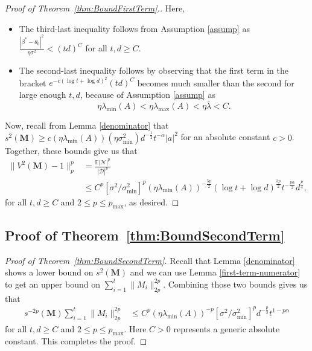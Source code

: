 \documentclass[11pt, reqno,english]{amsart}
\begin{document}
\begin{proof}[Proof of Theorem~\ref{thm:BoundFirstTerm}.]
Here,
\begin{itemize}
    \item The third-last inequality follows from Assumption \ref{assump} as $\frac{|\beta^* - \theta_0|^2}{\eta \sigma^2} < (td)^{C}$ for all $t, d \geq C$. 
    \item The second-last inequality follows by observing that the first term in the bracket $e^{-c(\log t + \log d)^2}(td)^C$ becomes much smaller than the second for large enough $t,d$, because of Assumption \ref{assump} as $$\eta \lambda_{\min}(A) < \eta \lambda_{\max}(A) < \eta \bar{\lambda} < C.$$
\end{itemize}  
Now, recall from Lemma \ref{denominator} that $s^2(\mathbf{M}) \geq c(\eta \lambda_{\min}(A))(\eta \sigma^2_{\min})d^{-\frac{1}{2}}t^{-\alpha}|a|^2$ for an absolute constant $c > 0$. Together, these bounds give us that
\begin{align*}
\|V^2(\mathbf{M}) - 1\|^p_p &= \frac{\mathbb{E}|\mathcal N|^p}{|\mathcal D|^p}
\\
&\leq C^p[\sigma^2/\sigma^2_{\min}]^p (\eta \lambda_{\min}(A))^{-\frac{5p}{2}}(\log t + \log d)^{\frac{3p}{2}}t^{-\frac{p\alpha}{2}}d^{\frac{p}{4}},
\end{align*}
for all $t,d \geq C$ and $2 \leq p \leq p_{\max}$, as desired. 
\end{proof}

\subsection{Proof of Theorem~\ref{thm:BoundSecondTerm}}\label{second-term}

\begin{proof}[Proof of Theorem~\ref{thm:BoundSecondTerm}]
Recall that Lemma \ref{denominator} shows a lower bound on $s^{2}(\mathbf{M})$ and we can use Lemma \ref{first-term-numerator} to get an upper bound on $\sum_{i = 1}^t\|M_i\|^{2p}_{2p}$.  Combining those two bounds gives us that
\begin{align*}
s^{-2p}(\mathbf{M})\sum_{i = 1}^t \|M_i\|^{2p}_{2p} &\leq C^p (\eta \lambda_{\min}(A))^{-p}[\sigma^2/\sigma^2_{\min}]^p d^{-\frac{p}{2}}t^{1-p\alpha} 
\end{align*}
for all $t, d\geq C$ and $2 \leq p \leq p_{\max}$. Here $C > 0$ represents a generic absolute constant. This completes the proof.
\end{proof}
\end{document}
